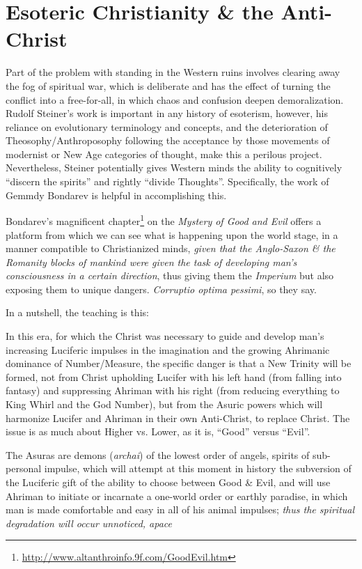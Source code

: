 \section{Esoteric Christianity \& the Anti-Christ}

Part of the problem with standing in the Western ruins involves clearing away the fog of spiritual war, which is deliberate and has the effect of turning the conflict into a free-for-all, in which chaos and confusion deepen demoralization. Rudolf Steiner's work is important in any history of esoterism, however, his reliance on evolutionary terminology and concepts, and the deterioration of Theosophy/Anthroposophy following the acceptance by those movements of modernist or New Age categories of thought, make this a perilous project. Nevertheless, Steiner potentially gives Western minds the ability to cognitively ``discern the spirits'' and rightly ``divide Thoughts''. Specifically, the work of Gemmdy Bondarev is helpful in accomplishing this.

Bondarev's magnificent chapter\footnote{\url{http://www.altanthroinfo.9f.com/GoodEvil.htm}} on the
\emph{Mystery of Good and Evil} offers a platform from which we can see what is happening upon the world stage, in a manner compatible to Christianized minds, \emph{given that the Anglo-Saxon \& the Romanity blocks of mankind were given the task of developing man's consciousness in a certain direction}, thus giving them the \emph{Imperium} but also exposing them to unique dangers. \emph{Corruptio optima pessimi}, so they say.

In a nutshell, the teaching is this:

In this era, for which the Christ was necessary to guide and develop man's increasing Luciferic impulses in the imagination and the growing Ahrimanic dominance of Number/Measure, the specific danger is that a New Trinity will be formed, not from Christ upholding Lucifer with his left hand (from falling into fantasy) and suppressing Ahriman with his right (from reducing everything to King Whirl and the God Number), but from the Asuric powers which will harmonize Lucifer and Ahriman in their own Anti-Christ, to replace Christ. The issue is as much about Higher vs. Lower, as it is, ``Good'' versus ``Evil''.

The Asuras are demons (\emph{archai}) of the lowest order of angels, spirits of sub-personal impulse, which will attempt at this moment in history the subversion of the Luciferic gift of the ability to choose between Good \& Evil, and will use Ahriman to initiate or incarnate a one-world order or earthly paradise, in which man is made comfortable and easy in all of his animal impulses; \emph{thus the spiritual degradation will occur unnoticed, apace}

